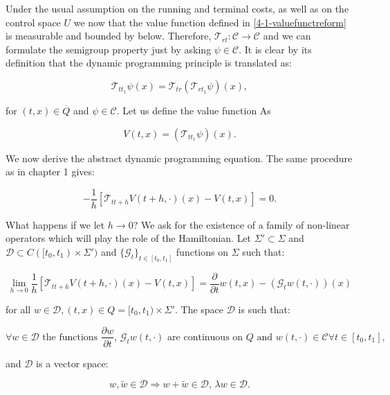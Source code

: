 Under the usual assumption on the running and terminal costs, as well as on the control space $U$ we now that the value function defined in \ref{4-1-valuefunctreform} 
is measurable and bounded by below. Therefore, $\mathcal{T}_{rt}:\mathcal{C}\rightarrow\mathcal{C}$ and we can formulate the semigroup property just by asking $\psi\in\mathcal{C}$. 
It is clear by its definition that the dynamic programming principle is translated as:

\[\mathcal{T}_{tt_1}\psi(x)=\mathcal{T}_{tr}\left(\mathcal{T}_{rt_1}\psi\right)(x),\]

for $(t,x)\in\overline{Q}$ and $\psi\in\mathcal{C}$. Let us define the value function As

\begin{equation}
    V(t,x) = (\mathcal{T}_{tt_1}\psi)(x).
\end{equation}

We now derive the abstract dynamic programming equation. The same procedure as in chapter 1 gives:

\[-\frac{1}{h}\left[\mathcal{T}_{tt+h}V(t+h,\cdot)(x)-V(t,x)\right]=0.\]

What happens if we let $h\to0$? We ask for the existence of a family of non-linear operators which will play the role of the Hamiltonian. 
Let $\Sigma'\subset\Sigma$ and $\mathcal{D}\subset C([t_0,t_1)\times\Sigma')$ and $\{\mathcal{G}_t\}_{t\in[t_0,t_1]}$ functions on $\Sigma$ such that:

\begin{equation}\label{4-1-conditiononG_t}
    \lim_{h\to 0}\frac{1}{h}\left[\mathcal{T}_{tt+h}V(t+h,\cdot)(x)-V(t,x)\right] = \frac{\partial}{\partial t}w(t,x) - (\mathcal{G}_tw(t,\cdot))(x)
\end{equation}

for all $w\in\mathcal{D},(t,x)\in Q=[t_0,t_1)\times\Sigma'$. The space $\mathcal{D}$ is such that:

\begin{equation}\label{4-1-conditiononD}
    \forall w\in\mathcal{D} \text{ the functions }\frac{\partial w}{\partial t},\,\mathcal{G}_tw(t,\cdot) \text{ are continuous on $Q$ and }w(t,\cdot)\in\mathcal{C} \forall t\in[t_0,t_1], 
\end{equation}

and $\mathcal{D}$ is a vector space:

\begin{equation}
    w,\tilde{w}\in\mathcal{D} \Rightarrow w+\tilde{w}\in\mathcal{D},\,\lambda w\in\mathcal{D}.
\end{equation}

